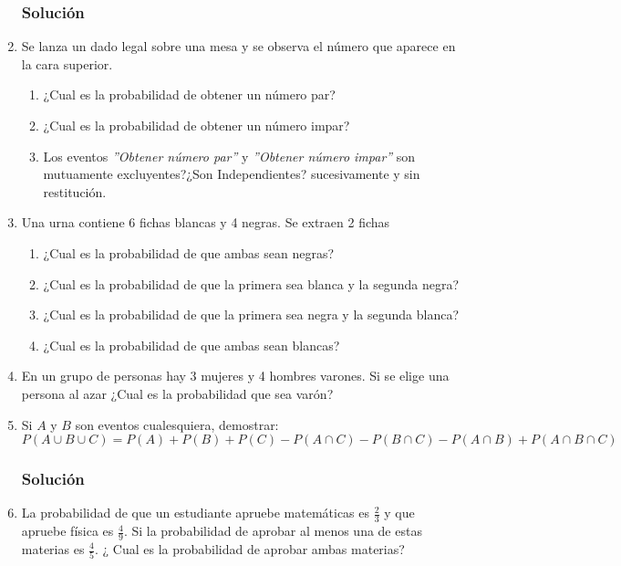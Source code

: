 \begin{enumerate}
\subsubsection{Solución}
\item Se lanza un dado legal sobre una mesa y se observa el número que aparece en la cara superior.
\begin{enumerate}
\item ¿Cual es la probabilidad de obtener un número par?
\item ¿Cual es la probabilidad de obtener un número impar?
\item Los eventos \textit{''Obtener número par''} y \textit{''Obtener número impar''} son mutuamente excluyentes?¿Son Independientes?
 sucesivamente y sin restitución.
\end{enumerate}
\item Una urna contiene 6 fichas blancas y 4 negras. Se extraen 2 fichas
\begin{enumerate}
\item ¿Cual es la probabilidad de que ambas sean negras?
\item ¿Cual es la probabilidad de que la primera sea blanca y la segunda negra?
\item ¿Cual es la probabilidad de que la primera sea negra y la segunda blanca?
\item ¿Cual es la probabilidad de que ambas sean blancas?
\end{enumerate}
\item En un grupo de personas hay 3 mujeres y 4 hombres varones. Si se elige una persona al azar ¿Cual es la probabilidad que sea varón?
\item Si $A$ y  $B$ son eventos cualesquiera, demostrar:
$$P(A\cup B\cup C)=P(A)+P(B)+P(C)-P(A\cap C)-P(B\cap C)-P(A\cap B)+P(A\cap B \cap C)$$
\subsubsection{Solución}
\item La probabilidad de que un estudiante apruebe matemáticas es $\frac{2}{3}$ y que apruebe física es $\frac{4}{9}$. Si la probabilidad de aprobar al menos una de estas materias es $\frac{4}{5}$. ¿ Cual es la probabilidad de aprobar ambas materias?

\end{enumerate}
